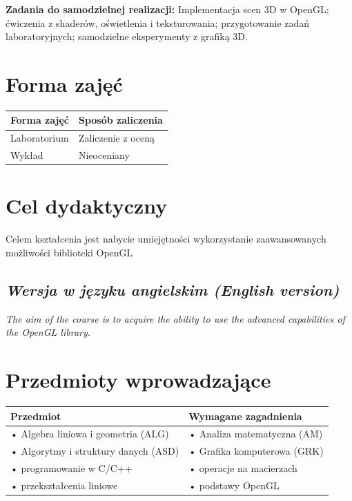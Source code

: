 \documentclass[12pt, a4paper]{article}
\begin{document}
\vspace{4pt}
\noindent\textbf{Zadania do samodzielnej realizacji:} Implementacja scen 3D w OpenGL; ćwiczenia z shaderów, oświetlenia i teksturowania; przygotowanie zadań laboratoryjnych; samodzielne eksperymenty z grafiką 3D.

\section{Forma zajęć}

\begin{tabular}{ll}
  \hline
  \textbf{Forma zajęć} & \textbf{Sposób zaliczenia} \\
  \hline
  Laboratorium & Zaliczenie z oceną \\
  Wykład & Nieoceniany \\
  \hline
\end{tabular}

\section{Cel dydaktyczny}

Celem kształcenia jest nabycie umiejętności wykorzystanie zaawansowanych możliwości biblioteki OpenGL

\subsection*{\textit{Wersja w języku angielskim (English version)}}

\textit{The aim of the course is to acquire the ability to use the advanced capabilities of the OpenGL library.}


\section{Przedmioty wprowadzające}

\begin{tabularx}{\textwidth}{lX}
  \hline
  \textbf{Przedmiot} & \textbf{Wymagane zagadnienia} \\
  \hline
  • Algebra liniowa i geometria  (ALG) & • Analiza matematyczna  (AM) \\
  • Algorytmy i struktury danych (ASD) & • Grafika komputerowa (GRK) \\
  • programowanie w C/C++ & • operacje na macierzach \\
  • przekształcenia liniowe & • podstawy OpenGL \\
  \hline
\end{tabularx}
\end{document}
